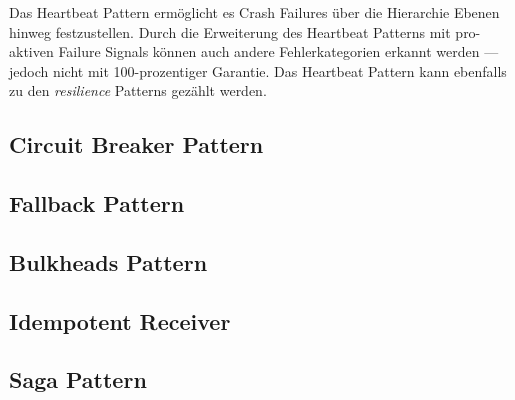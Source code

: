 Das Heartbeat Pattern ermöglicht es Crash Failures über die Hierarchie Ebenen hinweg festzustellen. Durch die Erweiterung des Heartbeat Patterns mit pro-aktiven Failure Signals können auch andere Fehlerkategorien erkannt werden --- jedoch nicht mit 100-prozentiger Garantie. Das Heartbeat Pattern kann ebenfalls zu den \textit{resilience} Patterns gezählt werden. 

\pagebreak

\subsection{Circuit Breaker Pattern}

\pagebreak

\subsection{Fallback Pattern}

\pagebreak

\subsection{Bulkheads Pattern}

\pagebreak

\subsection{Idempotent Receiver}

\pagebreak

\subsection{Saga Pattern}
